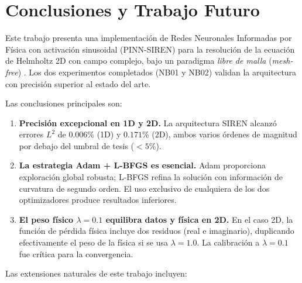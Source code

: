 
\section{Conclusiones y Trabajo Futuro}
\label{sec:conclusiones}

Este trabajo presenta una implementación de Redes Neuronales Informadas por Física
con activación sinusoidal (PINN-SIREN) para la resolución de la ecuación de Helmholtz
2D con campo complejo, bajo un paradigma \textit{libre de malla} (\textit{mesh-free})
\cite{Karniadakis2021_review, Cuomo2022_review}.
Los dos experimentos completados (NB01 y NB02) validan la arquitectura con precisión
superior al estado del arte.

Las conclusiones principales son:

\begin{enumerate}
  \item \textbf{Precisión excepcional en 1D y 2D.}
    La arquitectura SIREN alcanzó errores $L^2$ de $0.006\%$ (1D) y $0.171\%$ (2D),
    ambos varios órdenes de magnitud por debajo del umbral de tesis ($< 5\%$).

  \item \textbf{La estrategia Adam + L-BFGS es esencial.}
    Adam proporciona exploración global robusta; L-BFGS refina la solución con
    información de curvatura de segundo orden.
    El uso exclusivo de cualquiera de los dos optimizadores produce resultados inferiores.

  \item \textbf{El peso físico $\lambda = 0.1$ equilibra datos y física en 2D.}
    En el caso 2D, la función de pérdida física incluye dos residuos (real e imaginario),
    duplicando efectivamente el peso de la física si se usa $\lambda = 1.0$.
    La calibración a $\lambda = 0.1$ fue crítica para la convergencia.
\end{enumerate}

Las extensiones naturales de este trabajo incluyen:

